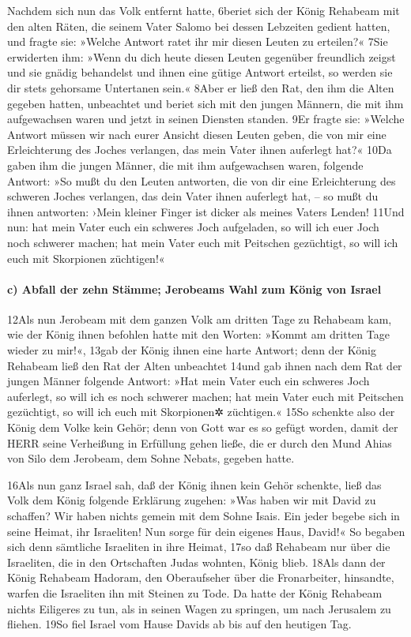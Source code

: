 Nachdem sich nun das Volk entfernt hatte, 6beriet sich der König
Rehabeam mit den alten Räten, die seinem Vater Salomo bei dessen
Lebzeiten gedient hatten, und fragte sie: »Welche Antwort ratet ihr mir
diesen Leuten zu erteilen?« 7Sie erwiderten ihm: »Wenn du dich heute
diesen Leuten gegenüber freundlich zeigst und sie gnädig behandelst und
ihnen eine gütige Antwort erteilst, so werden sie dir stets gehorsame
Untertanen sein.« 8Aber er ließ den Rat, den ihm die Alten gegeben
hatten, unbeachtet und beriet sich mit den jungen Männern, die mit ihm
aufgewachsen waren und jetzt in seinen Diensten standen. 9Er fragte sie:
»Welche Antwort müssen wir nach eurer Ansicht diesen Leuten geben, die
von mir eine Erleichterung des Joches verlangen, das mein Vater ihnen
auferlegt hat?« 10Da gaben ihm die jungen Männer, die mit ihm
aufgewachsen waren, folgende Antwort: »So mußt du den Leuten antworten,
die von dir eine Erleichterung des schweren Joches verlangen, das dein
Vater ihnen auferlegt hat, -- so mußt du ihnen antworten: ›Mein kleiner
Finger ist dicker als meines Vaters Lenden! 11Und nun: hat mein Vater
euch ein schweres Joch aufgeladen, so will ich euer Joch noch schwerer
machen; hat mein Vater euch mit Peitschen gezüchtigt, so will ich euch
mit Skorpionen züchtigen!«

\hypertarget{c-abfall-der-zehn-stuxe4mme-jerobeams-wahl-zum-kuxf6nig-von-israel}{%
\paragraph{c) Abfall der zehn Stämme; Jerobeams Wahl zum König von
Israel}\label{c-abfall-der-zehn-stuxe4mme-jerobeams-wahl-zum-kuxf6nig-von-israel}}

12Als nun Jerobeam mit dem ganzen Volk am dritten Tage zu Rehabeam kam,
wie der König ihnen befohlen hatte mit den Worten: »Kommt am dritten
Tage wieder zu mir!«, 13gab der König ihnen eine harte Antwort; denn der
König Rehabeam ließ den Rat der Alten unbeachtet 14und gab ihnen nach
dem Rat der jungen Männer folgende Antwort: »Hat mein Vater euch ein
schweres Joch auferlegt, so will ich es noch schwerer machen; hat mein
Vater euch mit Peitschen gezüchtigt, so will ich euch mit Skorpionen✲
züchtigen.« 15So schenkte also der König dem Volke kein Gehör; denn von
Gott war es so gefügt worden, damit der HERR seine Verheißung in
Erfüllung gehen ließe, die er durch den Mund Ahias von Silo dem
Jerobeam, dem Sohne Nebats, gegeben hatte.

16Als nun ganz Israel sah, daß der König ihnen kein Gehör schenkte, ließ
das Volk dem König folgende Erklärung zugehen: »Was haben wir mit David
zu schaffen? Wir haben nichts gemein mit dem Sohne Isais. Ein jeder
begebe sich in seine Heimat, ihr Israeliten! Nun sorge für dein eigenes
Haus, David!« So begaben sich denn sämtliche Israeliten in ihre Heimat,
17so daß Rehabeam nur über die Israeliten, die in den Ortschaften Judas
wohnten, König blieb. 18Als dann der König Rehabeam Hadoram, den
Oberaufseher über die Fronarbeiter, hinsandte, warfen die Israeliten ihn
mit Steinen zu Tode. Da hatte der König Rehabeam nichts Eiligeres zu
tun, als in seinen Wagen zu springen, um nach Jerusalem zu fliehen. 19So
fiel Israel vom Hause Davids ab bis auf den heutigen Tag.


